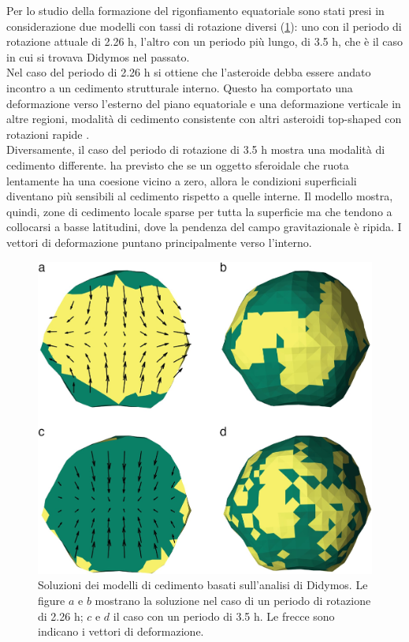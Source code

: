Per lo studio della formazione del rigonfiamento equatoriale sono stati presi in considerazione due modelli con tassi di rotazione diversi (\cref{fig:failure_models}): uno con il periodo di rotazione attuale di 2.26 h, l'altro con un periodo più lungo, di 3.5 h, che è il caso in cui si trovava Didymos nel passato.\\
Nel caso del periodo di 2.26 h si ottiene che l'asteroide debba essere andato incontro a un cedimento strutturale interno. Questo ha comportato una deformazione verso l'esterno del piano equatoriale e una deformazione verticale in altre regioni, modalità di cedimento consistente con altri asteroidi top-shaped con rotazioni rapide \citep{hirabayashi_rotationally_2019}.\\
Diversamente, il caso del periodo di rotazione di 3.5 h mostra una modalità di cedimento differente. \citet{hirabayashi_failure_2015} ha previsto che se un oggetto sferoidale che ruota lentamente ha una coesione vicino a zero, allora le condizioni superficiali diventano più sensibili al cedimento rispetto a quelle interne. Il modello mostra, quindi, zone di cedimento locale sparse per tutta la superficie ma che tendono a collocarsi a basse latitudini, dove la pendenza del campo gravitazionale è ripida. I vettori di deformazione puntano principalmente verso l'interno.

\begin{figure}
    \centering
    \includegraphics[scale=0.6]{figure/failure_models.jpg}
    \caption[Soluzioni dei modelli di cedimento basati sull'analisi di Didymos.]{Soluzioni dei modelli di cedimento basati sull'analisi di Didymos. Le figure $a$ e $b$ mostrano la soluzione nel caso di un periodo di rotazione di 2.26 h; $c$ e $d$ il caso con un periodo di 3.5 h. Le frecce sono indicano i vettori di deformazione. \citep{naidu_radar_2020}}
    \label{fig:failure_models}
\end{figure}

